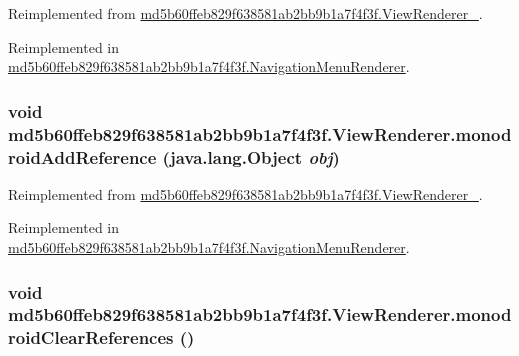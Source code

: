 Reimplemented from \hyperlink{classmd5b60ffeb829f638581ab2bb9b1a7f4f3f_1_1_view_renderer__2_a0898cf56fa9a49b653470eaf1608e77}{md5b60ffeb829f638581ab2bb9b1a7f4f3f.ViewRenderer\_}.

Reimplemented in \hyperlink{classmd5b60ffeb829f638581ab2bb9b1a7f4f3f_1_1_navigation_menu_renderer_98a35b1cf5c157fc7aacf89402e6bed1}{md5b60ffeb829f638581ab2bb9b1a7f4f3f.NavigationMenuRenderer}.\hypertarget{classmd5b60ffeb829f638581ab2bb9b1a7f4f3f_1_1_view_renderer_9ce576208d6e67c5201f21b67a8baf34}{
\subsubsection[{monodroidAddReference}]{\setlength{\rightskip}{0pt plus 5cm}void md5b60ffeb829f638581ab2bb9b1a7f4f3f.ViewRenderer.monodroidAddReference (java.lang.Object {\em obj})}}
\label{classmd5b60ffeb829f638581ab2bb9b1a7f4f3f_1_1_view_renderer_9ce576208d6e67c5201f21b67a8baf34}




Reimplemented from \hyperlink{classmd5b60ffeb829f638581ab2bb9b1a7f4f3f_1_1_view_renderer__2_64ca8244a89f60a47c173d9c0b15d610}{md5b60ffeb829f638581ab2bb9b1a7f4f3f.ViewRenderer\_}.

Reimplemented in \hyperlink{classmd5b60ffeb829f638581ab2bb9b1a7f4f3f_1_1_navigation_menu_renderer_28a29aa89bcd264a300fc518ddef9f73}{md5b60ffeb829f638581ab2bb9b1a7f4f3f.NavigationMenuRenderer}.\hypertarget{classmd5b60ffeb829f638581ab2bb9b1a7f4f3f_1_1_view_renderer_a03a52443eaab5b1890013945129a8e2}{
\subsubsection[{monodroidClearReferences}]{\setlength{\rightskip}{0pt plus 5cm}void md5b60ffeb829f638581ab2bb9b1a7f4f3f.ViewRenderer.monodroidClearReferences ()}}
\label{classmd5b60ffeb829f638581ab2bb9b1a7f4f3f_1_1_view_renderer_a03a52443eaab5b1890013945129a8e2}




